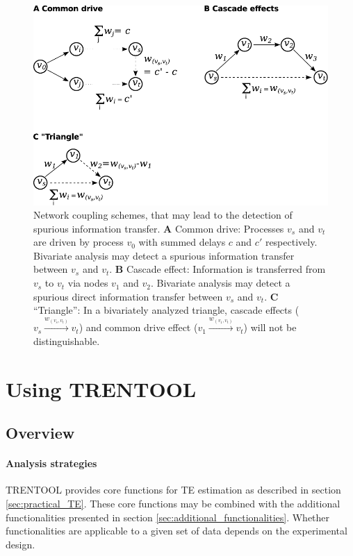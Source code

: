 \documentclass[a4paper,10pt]{article}
\begin{document}
\begin{figure}[H]	
	\centering
 		\includegraphics[scale=0.85]{figures/spurious_effects.pdf}
	\caption[Spurious results]{Network coupling schemes, that may lead to the detection of spurious information transfer. 
	\textbf{A} Common drive: Processes $v_s$ and $v_t$ are driven by process $v_0$ with summed delays $c$ and $c'$ respectively. Bivariate analysis may detect a spurious information transfer between $v_s$ and $v_t$. 
	\textbf{B} Cascade effect: Information is transferred from $v_s$ to $v_t$ via nodes $v_1$ and $v_2$. Bivariate analysis may detect a spurious direct information transfer between $v_s$ and $v_t$.
	\textbf{C} ``Triangle'': In a bivariately analyzed triangle, cascade effects ($v_s\stackrel{w_{(v_s,v_t)}}{\rightarrow}v_t$) and common drive effect ($v_1\stackrel{w_{(v_1,v_t)}}{\rightarrow}v_t$) will not be distinguishable.}
	\label{fig:spurious_effects}
\end{figure}







\newpage
\section{Using TRENTOOL} \label{sec:using_TRENTOOL}

\subsection{Overview} \label{sec:overview}

\paragraph*{Analysis strategies} TRENTOOL provides core functions for TE estimation as described in section \ref{sec:practical_TE}. These core functions may be combined with the additional functionalities presented in section \ref{sec:additional_functionalities}. Whether functionalities are applicable to a given set of data depends on the experimental design. %
\end{document}
